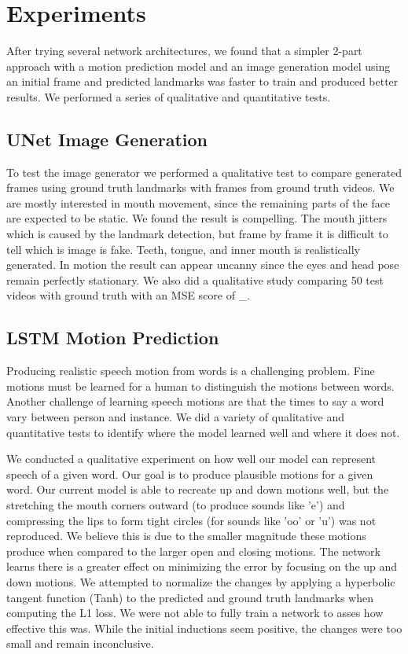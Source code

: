 \documentclass[10pt,twocolumn,letterpaper]{article}
\begin{document}
\section{Experiments}

 After trying several network architectures, we found that a simpler 2-part approach with a motion prediction model and an image generation model using an initial frame and predicted landmarks was faster to train and produced better results. We performed a series of qualitative and quantitative tests. 
 
\subsection{UNet Image Generation}
 To test the image generator we performed a qualitative test to compare generated frames using ground truth landmarks with frames from ground truth videos. We are mostly interested in mouth movement, since the remaining parts of the face are expected to be static. We found the result is compelling. The mouth jitters which is caused by the landmark detection, but frame by frame it is difficult to tell which is image is fake. Teeth, tongue, and inner mouth is realistically generated. In motion the result can appear uncanny since the eyes and head pose remain perfectly stationary. We also did a qualitative study comparing 50 test videos with ground truth with an MSE score of \_.
 
\subsection{LSTM Motion Prediction}
 Producing realistic speech motion from words is a challenging problem. Fine motions must be learned for a human to distinguish the motions between words. Another challenge of learning speech motions are that the times to say a word vary between person and instance. We did a variety of qualitative and quantitative tests to identify where the model learned well and where it does not. 
 
 We conducted a qualitative experiment on how well our model can represent speech of a given word. Our goal is to produce plausible motions for a given word. Our current model is able to recreate up and down motions well, but the stretching the mouth corners outward (to produce sounds like 'e') and compressing the lips to form tight circles (for sounds like 'oo' or 'u') was not reproduced. We believe this is due to the smaller magnitude these motions produce when compared to the larger open and closing motions. The network learns there is a greater effect on minimizing the error by focusing on the up and down motions. We attempted to normalize the changes by applying a hyperbolic tangent function (Tanh) to the predicted and ground truth landmarks when computing the L1 loss. We were not able to fully train a network to asses how effective this was. While the initial inductions seem positive, the changes were too small and remain inconclusive. 
 
\end{document}
